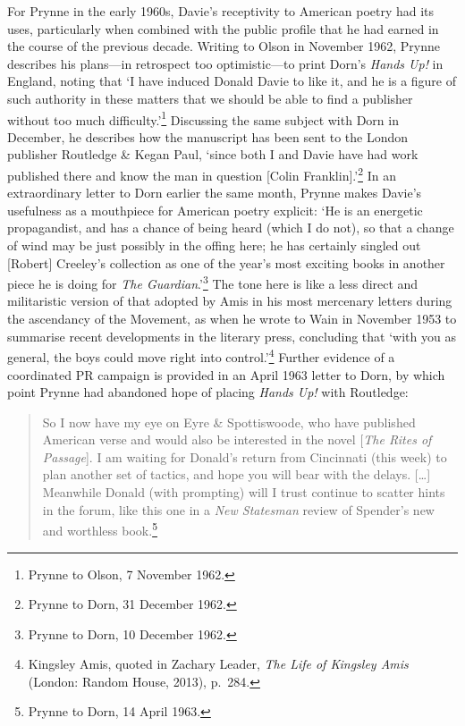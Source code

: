 \documentclass[]{article}
\begin{document}
For Prynne in the early 1960s, Davie's receptivity to American poetry
had its uses, particularly when combined with the public profile that he
had earned in the course of the previous decade. Writing to Olson in
November 1962, Prynne describes his plans---in retrospect too
optimistic---to print Dorn's \emph{Hands Up!} in England, noting that `I
have induced Donald Davie to like it, and he is a figure of such
authority in these matters that we should be able to find a publisher
without too much difficulty.'\footnote{Prynne to Olson, 7 November 1962.}
Discussing the same subject with Dorn in December, he describes how the
manuscript has been sent to the London publisher Routledge \& Kegan
Paul, `since both I and Davie have had work published there and know the
man in question {[}Colin Franklin{]}.'\footnote{Prynne to Dorn, 31
  December 1962.} In an extraordinary letter to Dorn earlier the same
month, Prynne makes Davie's usefulness as a mouthpiece for American
poetry explicit: `He is an energetic propagandist, and has a chance of
being heard (which I do not), so that a change of wind may be just
possibly in the offing here; he has certainly singled out {[}Robert{]}
Creeley's collection as one of the year's most exciting books in another
piece he is doing for \emph{The Guardian}.'\footnote{Prynne to Dorn, 10
  December 1962.} The tone here is like a less direct and militaristic
version of that adopted by Amis in his most mercenary letters during the
ascendancy of the Movement, as when he wrote to Wain in November 1953 to
summarise recent developments in the literary press, concluding that
`with you as general, the boys could move right into control.'\footnote{Kingsley
  Amis, quoted in Zachary Leader, \emph{The Life of Kingsley Amis}
  (London: Random House, 2013), p.~284.} Further evidence of a
coordinated PR campaign is provided in an April 1963 letter to Dorn, by
which point Prynne had abandoned hope of placing \emph{Hands Up!} with
Routledge:

\begin{quote}
So I now have my eye on Eyre \& Spottiswoode, who have published
American verse and would also be interested in the novel {[}\emph{The
Rites of Passage}{]}. I am waiting for Donald's return from Cincinnati
(this week) to plan another set of tactics, and hope you will bear with
the delays. {[}\ldots{}{]} Meanwhile Donald (with prompting) will I
trust continue to scatter hints in the forum, like this one in a
\emph{New Statesman} review of Spender's new and worthless
book.\footnote{Prynne to Dorn, 14 April 1963.}
\end{quote}
\end{document}
